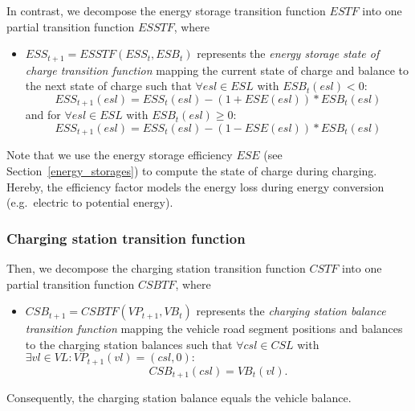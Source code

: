 In contrast, we decompose the energy storage transition function $ESTF$ into one partial transition function $ESSTF$, where
\begin{itemize}
	\item $ESS_{t+1} = ESSTF(ESS_t, ESB_t)$ represents the \textit{energy storage state of charge transition function} mapping the current state of charge and balance to the next state of charge such that $\forall esl \in ESL$ with $ESB_t(esl) < 0:$
	\begin{equation*}
	ESS_{t+1}(esl) = ESS_t(esl) - (1+ESE(esl)) * ESB_t(esl)
	\end{equation*}
	and for $\forall esl \in ESL$ with $ESB_t(esl) \geq 0:$
	\[
	ESS_{t+1}(esl) = ESS_t(esl) - (1-ESE(esl)) * ESB_t(esl)
	\]
	
\end{itemize}
Note that we use the energy storage efficiency $ESE$ (see Section~\ref{energy_storages}) to compute the state of charge during charging. Hereby, the efficiency factor models the energy loss during energy conversion (e.g.\ electric to potential energy). 

\subsubsection{Charging station transition function}
\label{transitions_stations}

Then, we decompose the charging station transition function $CSTF$ into one partial transition function $CSBTF$, where
\begin{itemize}
	\item $CSB_{t+1} = CSBTF(VP_{t+1}, VB_t)$ represents the \textit{charging station balance transition function} mapping the vehicle road segment positions and balances to the charging station balances such that $\forall csl \in CSL$ with $\exists vl \in VL: VP_{t+1}(vl) = (csl, 0):$
	\[
		CSB_{t+1}(csl) = VB_{t}(vl) \textrm{.}
	\]
\end{itemize}
Consequently, the charging station balance equals the vehicle balance.

